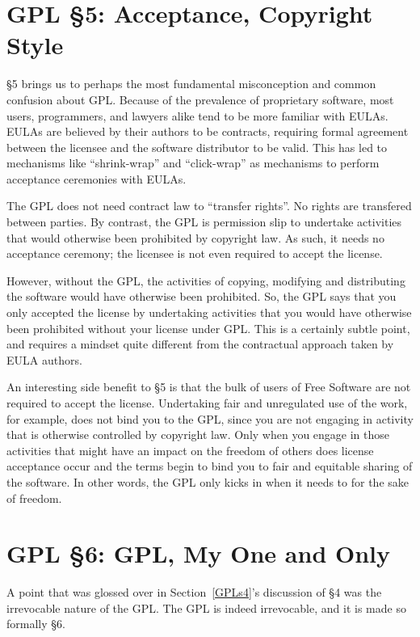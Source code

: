 \documentclass[12pt]{report}
\begin{document}
\section{GPL \S 5: Acceptance, Copyright Style}
\label{GPLs5}

\S 5 brings us to perhaps the most fundamental misconception and common
confusion about GPL\@.  Because of the prevalence of proprietary software,
most users, programmers, and lawyers alike tend to be more familiar with
EULAs.  EULAs are believed by their authors to be contracts, requiring
formal agreement between the licensee and the software distributor to be
valid.  This has led to mechanisms like ``shrink-wrap'' and ``click-wrap''
as mechanisms to perform acceptance ceremonies with EULAs.

The GPL does not need contract law to ``transfer rights''.  No rights are
transfered between parties.  By contrast, the GPL is permission slip to
undertake activities that would otherwise been prohibited by copyright law.
As such, it needs no acceptance ceremony; the licensee is not even
required to accept the license.

However, without the GPL, the activities of copying, modifying and
distributing the software would have otherwise been prohibited.  So, the
GPL says that you only accepted the license by undertaking activities that
you would have otherwise been prohibited without your license under GPL\@.
This is a certainly subtle point, and requires a mindset quite different
from the contractual approach taken by EULA authors.

An interesting side benefit to \S 5 is that the bulk of users of Free
Software are not required to accept the license.  Undertaking fair and
unregulated use of the work, for example, does not bind you to the GPL,
since you are not engaging in activity that is otherwise controlled by
copyright law.  Only when you engage in those activities that might have an
impact on the freedom of others does license acceptance occur and the
terms begin to bind you to fair and equitable sharing of the software.  In
other words, the GPL only kicks in when it needs to for the sake of
freedom.

\section{GPL \S 6: GPL, My One and Only}
\label{GPLs6}

A point that was glossed over in Section~\ref{GPLs4}'s discussion of \S 4
was the irrevocable nature of the GPL\@.  The GPL is indeed irrevocable,
and it is made so formally \S 6.
\end{document}
